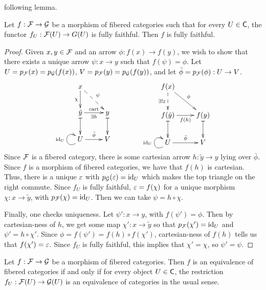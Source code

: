  following lemma.
 \begin{lemma}\label{lec21L:full_faithfulness_on_fibers}
   Let $f:\mathcal{F}\to \mathcal{G}$ be a morphism of fibered categories such that for every $U\in \text{\sf C}$, the
   functor $f_U:\mathcal{F}(U)\to G(U)$ is fully faithful. Then $f$ is fully faithful.
 \end{lemma}
 \begin{proof}
   Given $x,y\in \mathcal{F}$ and an arrow $\phi:f(x)\to f(y)$, we wish to show that there exists a
   unique arrow $\psi:x\to y$ such that $f(\psi)=\phi$. Let $U=p_{\mathcal{F}}(x) =
   p_{\mathcal{G}}(f(x))$, $V=p_{\mathcal{F}}(y)=p_{\mathcal{G}}(f(y))$, and let $\bar\phi=p_{\mathcal{F}}(\phi):U\to V$.
   \[\xymatrix{
    x \ar@{-->}[dr]^\psi \ar[d]_{\chi} \\
    \tilde y \ar@{|->}[d] \ar[r]_{\exists h}^{\text{cart}}& y \ar@{|->}[d]\\
    U\ar[r]^{\bar\phi} \ar@(dl,ul)^{\id_U} & V
   }\qquad\qquad \xymatrix{
    f(x)\ar@{-->}[d]_{\exists ! \e} \ar[dr]^\phi \\
    f(\tilde y)\ar[r]_{f(h)} \ar@{|->}[d]& f(y)\ar@{|->}[d] \\
    U\ar[r]^{\bar\phi} \ar@(dl,ul)^{\id_U} & V
   }\]
    Since $\mathcal{F}$ is a fibered category, there is some cartesian arrow $h:\tilde y\to y$ lying
   over $\bar\phi$. Since $f$ is a morphism of fibered categories, we have that $f(h)$ is
   cartesian. Thus, there is a unique $\varepsilon$ with $p_{\mathcal{G}}(\varepsilon)=\operatorname{id}_U$ which makes the top
   triangle on the right commute. Since $f_U$ is fully faithful, $\varepsilon=f(\chi)$ for a
   unique morphism $\chi:x\to \tilde y$, with $p_{\mathcal{F}}(\chi)=\operatorname{id}_U$. Then we can take
   $\psi=h\circ \chi$.

   Finally, one checks uniqueness. Let $\psi':x\to y$, with $f(\psi')=\phi$. Then by
   cartesian-ness of $h$, we get some map $\chi':x\to \tilde y$ so that
   $p_{\mathcal{F}}(\chi')=\operatorname{id}_U$ and $\psi'=h\circ \chi'$. Since $\phi=f(\psi')=f(h)\circ f(\chi')$,
   cartesian-ness of $f(h)$ tells us that $f(\chi')=\varepsilon$. Since $f_U$ is fully faithful,
   this implies that $\chi'=\chi$, so $\psi'=\psi$.
 \end{proof}
 \begin{proposition} \label{lec21P:check_equivs_on_fibers}
   Let $f:\mathcal{F}\to \mathcal{G}$ be a morphism of fibered categories. Then $f$ is an equivalence of
   fibered categories if and only if for every object $U\in \text{\sf C}$, the restriction
   $f_U:\mathcal{F}(U)\to \mathcal{G}(U)$ is an equivalence of categories in the usual sense.
 \end{proposition}
